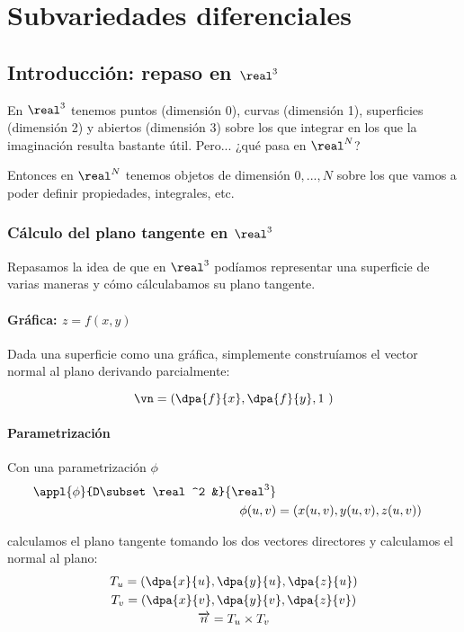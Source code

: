 \section{Subvariedades diferenciales}
  
  \subsection{Introducción: repaso en $\real^3$}
  
  En $\real^3$ tenemos puntos (dimensión 0), curvas (dimensión 1), superficies (dimensión 2) y abiertos (dimensión 3) sobre los que integrar en los que la imaginación resulta bastante útil. Pero... ¿qué pasa en $\real^N$? 
  
  Entonces en $\real^N$ tenemos objetos de dimensión $0,...,N$ sobre los que vamos a poder definir propiedades, integrales, etc.
  
\subsubsection{Cálculo del plano tangente en $\real^3$}  
  
  Repasamos la idea de que en $\real^3$ podíamos representar una superficie de varias maneras y cómo cálculabamos su plano tangente.
  \paragraph{Gráfica: $z=f(x,y)$} Dada una superficie como una gráfica, simplemente construíamos el vector normal al plano derivando parcialmente:
  
  \[ \vn = \left( \dpa{f}{x},\dpa{f}{y}, 1 \right) \]
  \paragraph{Parametrización}  Con una parametrización $\phi$ 
   	 \begin{align*}
  	 	\appl{\phi}{D\subset\real^2 &}{\real^3} \\     
     	\phi(u,v) &= (x(u,v),y(u,v),z(u,v))
     \end{align*}
  
     calculamos el plano tangente tomando los dos vectores directores y calculamos el normal al plano:
     \begin{gather*}
      	T_u = \left( \dpa{x}{u},\dpa{y}{u},\dpa{z}{u}\right)\\
      	T_v = \left( \dpa{x}{v},\dpa{y}{v},\dpa{z}{v}\right)\\
      	\overrightarrow{n} = T_u\times T_v\\
     \end{gather*}

